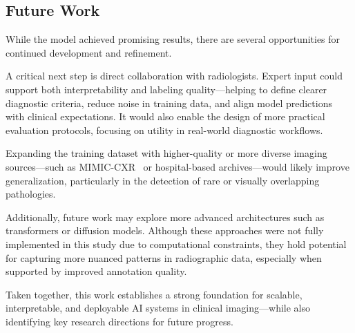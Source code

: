 \documentclass[12pt]{article}
\begin{document}
\begin{multicols}{2}
\subsection{Future Work}
While the model achieved promising results, there are several opportunities for continued development and refinement.

A critical next step is direct collaboration with radiologists. Expert input could support both interpretability and labeling quality—helping to define clearer diagnostic criteria, reduce noise in training data, and align model predictions with clinical expectations. It would also enable the design of more practical evaluation protocols, focusing on utility in real-world diagnostic workflows.

Expanding the training dataset with higher-quality or more diverse imaging sources—such as MIMIC-CXR~\cite{johnson2019mimic} or hospital-based archives—would likely improve generalization, particularly in the detection of rare or visually overlapping pathologies.

Additionally, future work may explore more advanced architectures such as transformers or diffusion models. Although these approaches were not fully implemented in this study due to computational constraints, they hold potential for capturing more nuanced patterns in radiographic data, especially when supported by improved annotation quality.

Taken together, this work establishes a strong foundation for scalable, interpretable, and deployable AI systems in clinical imaging—while also identifying key research directions for future progress.


\end{multicols}

\vspace{200pt}
\end{document}
